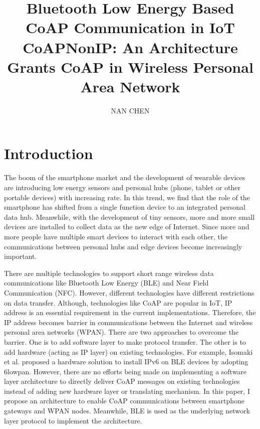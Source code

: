 \documentclass{Nan_Thesis}
\title{Bluetooth Low Energy Based CoAP Communication in IoT \\ CoAPNonIP: An Architecture Grants CoAP in Wireless Personal Area Network}
\author{NAN CHEN}
\begin{document}
\maketitle

\frontmatter


\chapter{Introduction}
The boom of the smartphone market and the development of wearable devices are introducing low energy sensors and personal hubs (phone, tablet or other portable devices) with increasing rate. In this trend, we find that the role of the smartphone has shifted from a single function device to an integrated personal data hub. Meanwhile, with the development of tiny sensors, more and more small devices are installed to collect data as the new edge of Internet. Since more and more people have multiple smart devices to interact with each other, the communications between personal hubs and edge devices become increasingly important.  

There are multiple technologies to support short range wireless data communications like Bluetooth Low Energy (BLE) and Near Field Communication (NFC). However, different technologies have different restrictions on data transfer. Although, technologies like CoAP are popular in IoT, IP address is an essential requirement in the current implementations. Therefore, the IP address becomes barrier in communications between the Internet and wireless personal area networks (WPAN). There are two approaches to overcome the barrier. One is to add software layer to make protocol transfer. The other is to add hardware (acting as IP layer) on existing technologies. For example, Isomaki et al. \cite{isomaki2013transmission} proposed a hardware solution to install IPv6 on BLE devices by adopting 6lowpan. However, there are no efforts being made on implementing a software layer architecture to directly deliver CoAP messages on existing technologies instead of adding new hardware layer or translating mechanism.  In this paper, I propose an architecture to enable CoAP communications between smartphone gateways and WPAN nodes. Meanwhile, BLE is used as the underlying network layer protocol to implement the architecture. 
\end{document}
